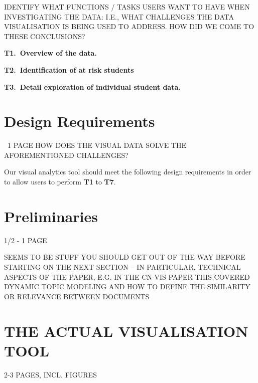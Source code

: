 \documentclass[letterpaper,twocolumn,fleqn]{article}
\begin{document}
IDENTIFY WHAT FUNCTIONS / TASKS USERS WANT TO HAVE WHEN INVESTIGATING THE DATA: I.E., WHAT CHALLENGES THE DATA VISUALISATION IS BEING USED TO ADDRESS. HOW DID WE COME TO THESE CONCLUSIONS?

{\bf T1.\ Overview of the data.} 

{\bf T2.\ Identification of at risk students} 

{\bf T3.\ Detail exploration of individual student data.} 


\section{Design Requirements}
~1 PAGE
\label{sec:dr}
HOW DOES THE VISUAL DATA SOLVE THE AFOREMENTIONED CHALLENGES?

Our visual analytics tool should meet the following design requirements in order to allow users to perform {\bf T1} to {\bf T7}.


\section{Preliminaries}
1/2 - 1 PAGE

SEEMS TO BE STUFF YOU SHOULD GET OUT OF THE WAY BEFORE STARTING ON THE NEXT SECTION -- IN PARTICULAR, TECHNICAL ASPECTS OF THE PAPER, E.G. IN THE CN-VIS PAPER THIS COVERED DYNAMIC TOPIC MODELING AND HOW TO DEFINE THE SIMILARITY OR RELEVANCE BETWEEN DOCUMENTS




\section{THE ACTUAL VISUALISATION TOOL}
2-3 PAGES, INCL. FIGURES
\label{sec:visualization}

\end{document}
